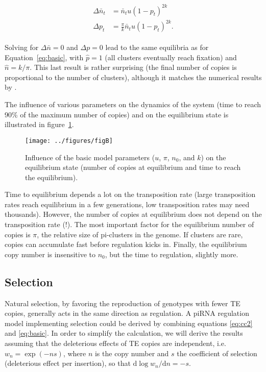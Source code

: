 \documentclass[10pt,a4paper]{article}
\begin{document}
\begin{align}\label{eq:clusters}
\begin{split}
\Delta \bar n_t &= \bar n_t u (1-p_t)^{2k} \\
\Delta p_t &= \frac{\pi}{k} \bar n_t u (1-p_t)^{2k}.
\end{split}
\end{align}

Solving for $\Delta \bar n = 0$ and $\Delta p= 0$ lead to the same equilibria as for Equation~\ref{eq:basic}, with $\hat p = 1$ (all clusters eventually reach fixation) and $\hat n = k/\pi$. This last result is rather surprising (the final number of copies is proportional to the number of clusters), although it matches the numerical results by \cite{Kof19}. 

The influence of various parameters on the dynamics of the system (time to reach 90\% of the maximum number of copies) and on the equilibrium state is illustrated in figure~\ref{fig:figB}. 

\begin{figure}[t]
\begin{adjustwidth}{-1in}{0in}
\begin{flushright}
\texttt{[image: ../figures/figB]}
\caption{\label{fig:figB} Influence of the basic model parameters ($u$, $\pi$, $n_0$, and $k$) on the equilibrium state (number of copies at equilibrium and time to reach the equilibrium). }
\end{flushright}\end{adjustwidth}
\end{figure}


Time to equilibrium depends a lot on the transposition rate (large transposition rates reach equilibrium in a few generations, low transposition rates may need thousands). However, the number of copies at equilibrium does not depend on the transposition rate (!). The most important factor for the equilibrium number of copies is $\pi$, the relative size of pi-clusters in the genome. If clusters are rare, copies can accumulate fast before regulation kicks in. Finally, the equilibrium copy number is insensitive to $n_0$, but the time to regulation, slightly more. 


\subsection{Selection}

Natural selection, by favoring the reproduction of genotypes with fewer TE copies, generally acts in the same direction as regulation. A piRNA regulation model implementing selection could be derived by combining equations \ref{eq:cc2} and \ref{eq:basic}. In order to simplify the calculation, we will derive the results assuming that the deleterious effects of TE copies are independent, i.e.\ $w_n = \exp(- n s)$, where $n$ is the copy number and $s$ the coefficient of selection (deleterious effect per insertion), so that $\mathrm{d} \log w_n / \mathrm{d} n = -s$. 
\end{document}
